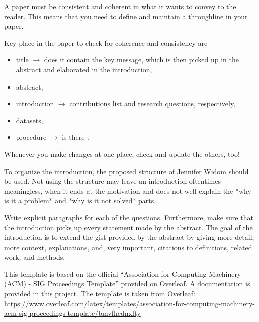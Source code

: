 \documentclass[sigconf, review, nonacm]{acmart}
\begin{document}
\begin{tcolorbox}[title=Have a throughline in your paper and maintain it!,colback=red!20]
    A paper must be consistent and coherent in what it wants to convey to the reader.
    This means that you need to define and maintain a throughline in your paper.

    Key place in the paper to check for coherence and consistency are
    \begin{itemize}
        \item title $\rightarrow$ does it contain the key message, which is then picked up in the abstract and elaborated in the introduction, 
        \item abstract, 
        \item introduction $\rightarrow$ contributions list and research questions, respectively, 
        \item datasets,
        \item procedure $\rightarrow$ is there .
    \end{itemize}


    Whenever you make changes at one place, check and update the others, too!
\end{tcolorbox}


\begin{tcolorbox}[title=Instructions: Write following this structure.]

To organize the introduction, the proposed structure of Jennifer Widom should be used. 
Not using the structure may leave an introduction oftentimes meaningless, when it ends at the motivation and does not well explain the *why is it a problem* and *why is it not solved* parts.

Write explicit paragraphs for each of the questions. 
Furthermore, make sure that the introduction picks up every statement made by the abstract.
The goal of the introduction is to extend the gist provided by the abstract by giving more detail, more context, explanations, and, very important, citations to definitions, related work, and methods.
\end{tcolorbox}

This template is based on the official ``Association for Computing Machinery (ACM) - SIG Proceedings Template'' provided on Overleaf. A documentation is provided in this project. The template is taken from Overleaf:
\url{https://www.overleaf.com/latex/templates/association-for-computing-machinery-acm-sig-proceedings-template/bmvfhcdnxfty}

\end{document}
